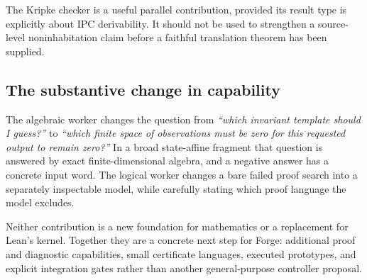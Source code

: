The Kripke checker is a useful parallel contribution, provided its result type
is explicitly about IPC derivability. It should not be used to strengthen a
source-level noninhabitation claim before a faithful translation theorem has
been supplied.

\subsection{The substantive change in capability}
The algebraic worker changes the question from
\emph{``which invariant template should I guess?''} to
\emph{``which finite space of observations must be zero for this requested
output to remain zero?''} In a broad state-affine fragment that question is
answered by exact finite-dimensional algebra, and a negative answer has a
concrete input word. The logical worker changes a bare failed proof search into
a separately inspectable model, while carefully stating which proof language
the model excludes.

Neither contribution is a new foundation for mathematics or a replacement for
Lean's kernel. Together they are a concrete next step for Forge: additional
proof and diagnostic capabilities, small certificate languages, executed
prototypes, and explicit integration gates rather than another general-purpose
controller proposal.
